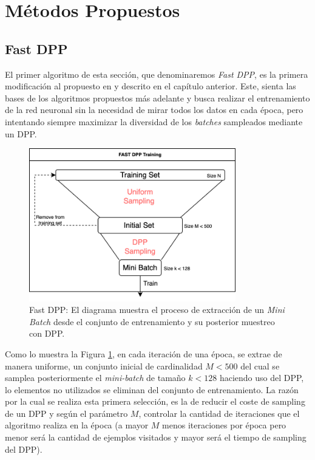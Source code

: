 \section{Métodos Propuestos}

\subsection{Fast DPP}

El primer algoritmo de esta sección, que denominaremos \textit{Fast DPP}, es la primera modificación al propuesto en \cite{https://doi.org/10.48550/arxiv.1804.02772} y descrito en el capítulo anterior. Este, sienta las bases de los algoritmos propuestos más adelante y busca realizar el entrenamiento de la red neuronal sin la necesidad de mirar todos los datos en cada época, pero intentando siempre maximizar la diversidad de los \textit{batches} sampleados mediante un DPP.

\begin{figure}[ht]
    \centering
    \includegraphics[width=9cm]{img/tesis/fast_dpp_diagram.png}
    \caption{Fast DPP: El diagrama muestra el proceso de extracción de un \textit{Mini Batch} desde el conjunto de entrenamiento y su posterior muestreo con DPP.}
    \label{fig:fast_dpp}
\end{figure}

Como lo muestra la Figura \ref{fig:fast_dpp}, en cada iteración de una época, se extrae de manera uniforme, un conjunto inicial de cardinalidad $M < 500$ del cual se samplea posteriormente el \textit{mini-batch} de tamaño $k < 128$ haciendo uso del DPP, lo elementos no utilizados se eliminan del conjunto de entrenamiento. La razón por la cual se realiza esta primera selección, es la de reducir el coste de sampling de un DPP y según el parámetro $M$, controlar la cantidad de iteraciones que el algoritmo realiza en la época (a mayor $M$ menos iteraciones por época pero menor será la cantidad de ejemplos visitados y mayor será el tiempo de sampling del DPP).   

